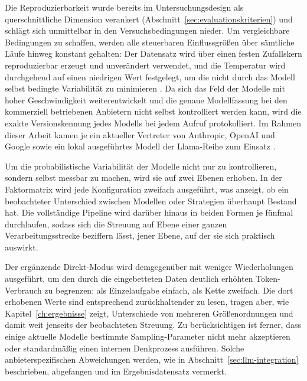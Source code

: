 Die Reproduzierbarkeit wurde bereits im Untersuchungsdesign als querschnittliche Dimension verankert (Abschnitt~\ref{sec:evaluationskriterien}) und schlägt sich unmittelbar in den Versuchsbedingungen nieder. Um vergleichbare Bedingungen zu schaffen, werden alle steuerbaren Einflussgrößen über sämtliche Läufe hinweg konstant gehalten: Der Datensatz wird über einen festen Zufallskern reproduzierbar erzeugt und unverändert verwendet, und die Temperatur wird durchgehend auf einen niedrigen Wert festgelegt, um die nicht durch das Modell selbst bedingte Variabilität zu minimieren \autocite{schulhoffPromptReportSystematic2025,zhaoSurveyLargeLanguage2026}. Da sich das Feld der Modelle mit hoher Geschwindigkeit weiterentwickelt und die genaue Modellfassung bei den kommerziell betriebenen Anbietern nicht selbst kontrolliert werden kann, wird die exakte Versionskennung jedes Modells bei jedem Aufruf protokolliert. Im Rahmen dieser Arbeit kamen je ein aktueller Vertreter von Anthropic, OpenAI und Google sowie ein lokal ausgeführtes Modell der Llama-Reihe zum Einsatz \autocite{2026AIIndex,zhaoSurveyLargeLanguage2026}.

Um die probabilistische Variabilität der Modelle nicht nur zu kontrollieren, sondern selbst messbar zu machen, wird sie auf zwei Ebenen erhoben. In der Faktormatrix wird jede Konfiguration zweifach ausgeführt, was anzeigt, ob ein beobachteter Unterschied zwischen Modellen oder Strategien überhaupt Bestand hat. Die vollständige Pipeline wird darüber hinaus in beiden Formen je fünfmal durchlaufen, sodass sich die Streuung auf Ebene einer ganzen Verarbeitungsstrecke beziffern lässt, jener Ebene, auf der sie sich praktisch auswirkt.

Der ergänzende Direkt-Modus wird demgegenüber mit weniger Wiederholungen ausgeführt, um den durch die eingebetteten Daten deutlich erhöhten Token-Verbrauch zu begrenzen: als Einzelaufgabe einfach, als Kette zweifach. Die dort erhobenen Werte sind entsprechend zurückhaltender zu lesen, tragen aber, wie Kapitel~\ref{ch:ergebnisse} zeigt, Unterschiede von mehreren Größenordnungen und damit weit jenseits der beobachteten Streuung. Zu berücksichtigen ist ferner, dass einige aktuelle Modelle bestimmte Sampling-Parameter nicht mehr akzeptieren oder standardmäßig einen internen Denkprozess ausführen. Solche anbieterspezifischen Abweichungen werden, wie in Abschnitt~\ref{sec:llm-integration} beschrieben, abgefangen und im Ergebnisdatensatz vermerkt.

